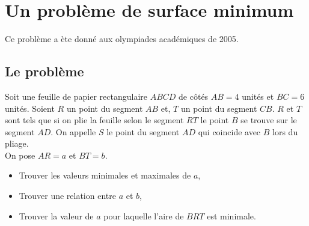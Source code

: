 \documentclass[a4paper,11pt]{book}
\begin{document}
\section{Un probl\`eme de surface minimum}
Ce probl\`eme a \`ete donn\'e aux olympiades acad\'emiques de 2005.
\subsection{Le probl\`eme}
Soit une feuille de papier rectangulaire $ABCD$ de c\^ot\'es $AB=4$ unit\'es 
et $BC=6$ unit\'es.
Soient $R$ un point du segment $AB$ et, $T$ un point du segment 
$CB$. $R$ et $T$ sont tels que si on plie la feuille selon le segment $RT$ 
le point $B$ se trouve sur le segment $AD$. On appelle $S$ le point du segment
$AD$ qui coincide avec $B$ lors du pliage.\\
On pose $AR=a$ et $BT=b$.\\
\begin{itemize}
\item Trouver les valeurs minimales et maximales de $a$,
\item Trouver une relation entre $a$ et $b$,
\item Trouver la valeur de $a$ pour laquelle l'aire de $BRT$ est minimale.
\end{itemize}
\end{document}
